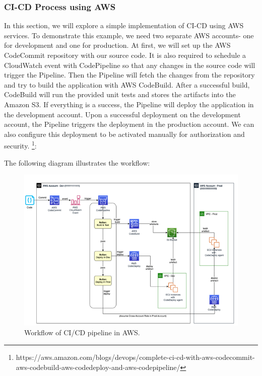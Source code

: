 %
\subsubsection{CI-CD Process using AWS}
%
In this section, we will explore a simple implementation of CI-CD using AWS services. To demonstrate this example, we need two separate AWS accounts- one for development and one for production. At first, we will set up the AWS CodeCommit repository with our source code. It is also required to schedule a CloudWatch event with CodePipeline so that any changes in the source code will trigger the Pipeline. Then the Pipeline will fetch the changes from the repository and try to build the application with AWS CodeBuild. After a successful build, CodeBuild will run the provided unit tests and stores the artifacts into the Amazon S3. If everything is a success, the Pipeline will deploy the application in the development account. Upon a successful deployment on the development account, the Pipeline triggers the deployment in the production account. We can also configure this deployment to be activated manually for authorization and security. \footnote{https://aws.amazon.com/blogs/devops/complete-ci-cd-with-aws-codecommit-aws-codebuild-aws-codedeploy-and-aws-codepipeline/}:

The following diagram illustrates the workflow:

\begin{figure}[h]
    \centering
    \includegraphics[width=\textwidth]{images/saiful/aws_cicd.png}
    \caption{Workflow of CI/CD pipeline in AWS.}
    \label{fig:aws_cicd}
\end{figure}

